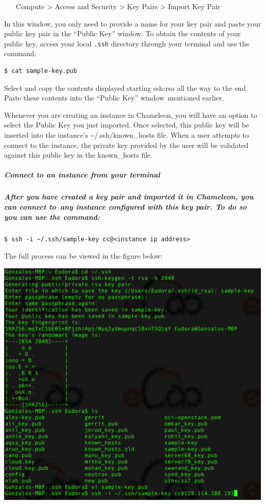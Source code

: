 ~ ~ Compute \textgreater{} Access and Security \textgreater{} Key Pairs
\textgreater{} Import Key Pair

In this window, you only need to provide a name for your key pair and
paste your public key pair in the ``Public Key'' window. To obtain the
contents of your public key, access your local \texttt{.ssh} directory
through your terminal and use the command:

\begin{verbatim}
$ cat sample-key.pub
\end{verbatim}

Select and copy the contents displayed starting ssh-rsa all the way to
the end. Paste these contents into the ``Public Key'' window~mentioned
earlier.

Whenever you are creating an instance in Chameleon, you will have an
option to select the Public Key you just imported. Once selected, this
public key will be inserted into the instance's
\textasciitilde{}/.ssh/known\_hosts file. When a user attempts to
connect to the instance, the private key provided by the user will be
validated against this public key in the known\_hosts file.

\subparagraph{Connect to an instance from your terminal}\label{connect-to-an-instance-from-your-terminal}

\subparagraph{After you have created a key pair and imported it in
Chameleon, you can connect to~any instance configured with this key
pair. To do so you can use the
command:}\label{after-you-have-created-a-key-pair-and-imported-it-in-chameleon-you-can-connect-toany-instance-configured-with-this-key-pair.-to-do-so-you-can-use-the-command}

\begin{verbatim}
$ ssh -i ~/.ssh/sample-key cc@<instance ip address>
\end{verbatim}

The full process can be viewed in the figure below:

{\includegraphics[width=\columnwidth]{images/chameleon/ssh1.png}}

